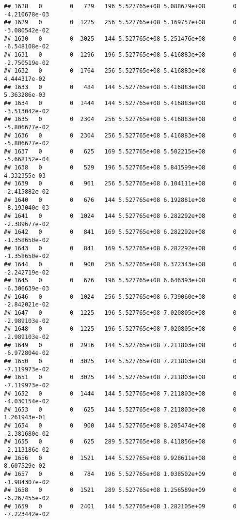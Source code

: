 \documentclass[
]{article}
\begin{document}
\begin{enumerate}
\begin{verbatim}
## 1628   0        0   729   196 5.527765e+08 5.088679e+08        0 -4.210678e-03
## 1629   0        0  1225   256 5.527765e+08 5.169757e+08        0 -3.080542e-02
## 1630   0        0  3025   144 5.527765e+08 5.251476e+08        0 -6.548108e-02
## 1631   0        0  1296   196 5.527765e+08 5.416883e+08        0 -2.750519e-02
## 1632   0        0  1764   256 5.527765e+08 5.416883e+08        0  4.444317e-02
## 1633   0        0   484   144 5.527765e+08 5.416883e+08        0  5.363286e-03
## 1634   0        0  1444   144 5.527765e+08 5.416883e+08        0 -3.513042e-02
## 1635   0        0  2304   256 5.527765e+08 5.416883e+08        0 -5.806677e-02
## 1636   0        0  2304   256 5.527765e+08 5.416883e+08        0 -5.806677e-02
## 1637   0        0   625   169 5.527765e+08 5.502215e+08        0 -5.668152e-04
## 1638   0        0   529   196 5.527765e+08 5.841599e+08        0  4.332355e-03
## 1639   0        0   961   256 5.527765e+08 6.104111e+08        0 -2.415882e-02
## 1640   0        0   676   144 5.527765e+08 6.192881e+08        0 -8.193040e-03
## 1641   0        0  1024   144 5.527765e+08 6.282292e+08        0 -2.389677e-02
## 1642   0        0   841   169 5.527765e+08 6.282292e+08        0 -1.358650e-02
## 1643   0        0   841   169 5.527765e+08 6.282292e+08        0 -1.358650e-02
## 1644   0        0   900   256 5.527765e+08 6.372343e+08        0 -2.242719e-02
## 1645   0        0   676   196 5.527765e+08 6.646393e+08        0 -6.306639e-03
## 1646   0        0  1024   256 5.527765e+08 6.739060e+08        0 -2.842021e-02
## 1647   0        0  1225   196 5.527765e+08 7.020805e+08        0 -2.989103e-02
## 1648   0        0  1225   196 5.527765e+08 7.020805e+08        0 -2.989103e-02
## 1649   0        0  2916   144 5.527765e+08 7.211803e+08        0 -6.972804e-02
## 1650   0        0  3025   144 5.527765e+08 7.211803e+08        0 -7.119973e-02
## 1651   0        0  3025   144 5.527765e+08 7.211803e+08        0 -7.119973e-02
## 1652   0        0  1444   144 5.527765e+08 7.211803e+08        0 -4.030154e-02
## 1653   0        0   625   144 5.527765e+08 7.211803e+08        0  1.261943e-01
## 1654   0        0   900   144 5.527765e+08 8.205474e+08        0 -2.381680e-02
## 1655   0        0   625   289 5.527765e+08 8.411856e+08        0 -2.113186e-02
## 1656   0        0  1521   144 5.527765e+08 9.928611e+08        0  8.607529e-02
## 1657   0        0   784   196 5.527765e+08 1.038502e+09        0 -1.984307e-02
## 1658   0        0  1521   289 5.527765e+08 1.256589e+09        0 -6.267455e-02
## 1659   0        0  2401   144 5.527765e+08 1.282105e+09        0 -7.223442e-02

\end{verbatim}
\end{enumerate}
\end{document}
